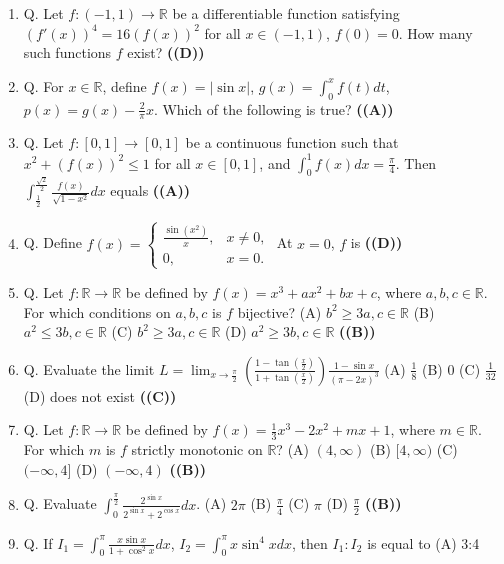 \documentclass{article}
\begin{document}
\begin{enumerate}
$J = \int_{0}^{1} \frac{x}{1 + x^8} dx$.
Consider the assertions:
I. $J > \frac{1}{4}$, II. $J < \frac{\pi}{8}$.
Which of the following is true? \hfill \textbf{((A))}
\item Q. Let $f : (-1, 1) \to \mathbb{R}$ be a differentiable function satisfying
$(f'(x))^4 = 16(f(x))^2$ for all $x \in (-1,1)$, $f(0) = 0$.
How many such functions $f$ exist? \hfill \textbf{((D))}
\item Q. For $x \in \mathbb{R}$, define
$f(x) = |\sin x|$, $g(x) = \int_{0}^{x} f(t) dt$, $p(x) = g(x) - \frac{2}{\pi} x$.
Which of the following is true? \hfill \textbf{((A))}
\item Q. Let $f : [0, 1] \to [0, 1]$ be a continuous function such that
$x^2 + (f(x))^2 \le 1$ for all $x \in [0, 1]$,
and
$\int_{0}^{1} f(x)dx = \frac{\pi}{4}$.
Then
$\int_{\frac{1}{2}}^{\frac{\sqrt{2}}{2}} \frac{f(x)}{\sqrt{1-x^2}} dx$
equals \hfill \textbf{((A))}
\item Q. Define
$f(x) = \begin{cases} \frac{\sin(x^2)}{x}, & x \neq 0, \\ 0, & x = 0. \end{cases}$
At $x = 0$, $f$ is \hfill \textbf{((D))}
\item Q. Let $f: \mathbb{R} \rightarrow \mathbb{R}$ be defined by $f(x) = x^3 + ax^2 + bx + c$, where $a, b, c \in \mathbb{R}$. For which conditions on $a, b, c$ is $f$ bijective?
(A) $b^2 \geq 3a, c \in \mathbb{R}$
(B) $a^2 \leq 3b, c \in \mathbb{R}$
(C) $b^2 \geq 3a, c \in \mathbb{R}$
(D) $a^2 \geq 3b, c \in \mathbb{R}$ \hfill \textbf{((B))}
\item Q. Evaluate the limit $L = \lim_{x\to\frac{\pi}{2}} \left( \frac{1 - \tan(\frac{x}{2})}{1 + \tan(\frac{x}{2})} \right) \frac{1 - \sin x}{(\pi - 2x)^3}$
(A) $\frac{1}{8}$
(B) 0
(C) $\frac{1}{32}$
(D) does not exist \hfill \textbf{((C))}
\item Q. Let $f: \mathbb{R}\to \mathbb{R}$ be defined by $f(x) = \frac{1}{3}x^3 - 2x^2 + mx + 1$, where $m \in \mathbb{R}$. For which $m$ is $f$ strictly monotonic on $\mathbb{R}$?
(A) $(4,\infty)$
(B) $[4,\infty)$
(C) $(-\infty,4]$
(D) $(-\infty,4)$ \hfill \textbf{((B))}
\item Q. Evaluate $\int_0^{\frac{\pi}{2}} \frac{2^{\sin x}}{2^{\sin x} + 2^{\cos x}} dx$.
(A) $2\pi$
(B) $\frac{\pi}{4}$
(C) $\pi$
(D) $\frac{\pi}{2}$ \hfill \textbf{((B))}
\item Q. If $I_1 = \int_0^{\pi} \frac{x \sin x}{1+\cos^2 x} dx$, $I_2 = \int_0^{\pi} x \sin^4 x dx$, then $I_1 : I_2$ is equal to
(A) 3:4

\end{enumerate}
\end{document}
